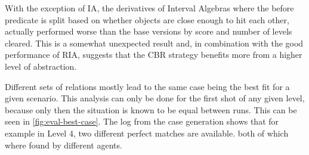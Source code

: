 With the exception of \ac{IA}, the derivatives of Interval Algebras where the before predicate is split based on whether objects are close enough to hit each other, actually performed worse than the base versions by score and number of levels cleared. This is a somewhat unexpected result and, in combination with the good performance of \ac{RIA}, suggests that the \ac{CBR} strategy benefits more from a higher level of abstraction.

Different sets of relations mostly lead to the same case being the best fit for a given scenario. This analysis can only be done for the first shot of any given level, because only then the situation is known to be equal between runs. This can be seen in \ref{fig:eval-best-case}. The log from the case generation shows that for example in Level 4, two different perfect matches are available. both of which where found by different agents.

